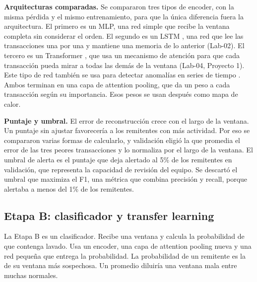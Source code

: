 \documentclass[11pt]{article}
\begin{document}
\textbf{Arquitecturas comparadas.} Se compararon tres tipos de encoder, con la misma pérdida y el mismo entrenamiento, para que la única diferencia fuera la arquitectura. El primero es un MLP, una red simple que recibe la ventana completa sin considerar el orden. El segundo es un LSTM \cite{hochreiter1997}, una red que lee las transacciones una por una y mantiene una memoria de lo anterior (Lab-02). El tercero es un Transformer \cite{vaswani2017}, que usa un mecanismo de atención para que cada transacción pueda mirar a todas las demás de la ventana (Lab-04, Proyecto 1). Este tipo de red también se usa para detectar anomalías en series de tiempo \cite{xu2022}. Ambos terminan en una capa de attention pooling, que da un peso a cada transacción según su importancia. Esos pesos se usan después como mapa de calor.

\textbf{Puntaje y umbral.} El error de reconstrucción crece con el largo de la ventana. Un puntaje sin ajustar favorecería a los remitentes con más actividad. Por eso se compararon varias formas de calcularlo, y validación eligió la que promedia el error de las tres peores transacciones y lo normaliza por el largo de la ventana. El umbral de alerta es el puntaje que deja alertado al 5\% de los remitentes en validación, que representa la capacidad de revisión del equipo. Se descartó el umbral que maximiza el F1, una métrica que combina precisión y recall, porque alertaba a menos del 1\% de los remitentes.

\subsection{Etapa B: clasificador y transfer learning}
\label{sec:etapab}

La Etapa B es un clasificador. Recibe una ventana y calcula la probabilidad de que contenga lavado. Usa un encoder, una capa de attention pooling nueva y una red pequeña que entrega la probabilidad. La probabilidad de un remitente es la de su ventana más sospechosa. Un promedio diluiría una ventana mala entre muchas normales.
\end{document}
